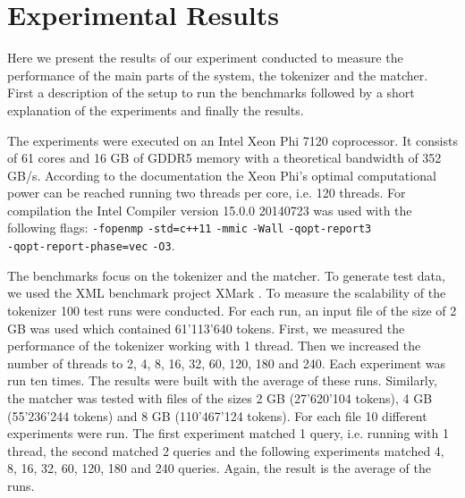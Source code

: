 
\section{Experimental Results}\label{sec:exp}

Here we present the results of our experiment conducted to measure the performance of the main parts of the system, the tokenizer and the matcher. First a description of the setup to run the benchmarks followed by a short explanation of the experiments and finally the results.

 The experiments were executed on an Intel Xeon Phi 7120 coprocessor. It consists of 61 cores and 16 GB of GDDR5 memory with a theoretical bandwidth of 352 GB/s. According to the documentation the Xeon Phi's optimal computational power can be reached running two threads per core, i.e. 120 threads.
For compilation the Intel Compiler version 15.0.0 20140723 was used with the following flags: \verb;-fopenmp; \verb;-std=c++11; \verb;-mmic; \verb;-Wall; \verb;-qopt-report3; \\ \verb;-qopt-report-phase=vec; \verb;-O3;.

The benchmarks focus on the tokenizer and the matcher. To generate test data, we used the XML benchmark project XMark \cite{Schmidt2002}. To measure the scalability of the tokenizer 100 test runs were conducted. For each run, an input file of the size of 2 GB was used which contained 61'113'640 tokens. First, we measured the performance of the tokenizer working with 1 thread. Then we increased the number of threads to 2, 4, 8, 16, 32, 60, 120, 180 and 240. Each experiment was run ten times. The results were built with the average of these runs. Similarly, the matcher was tested with files of the sizes 2 GB (27'620'104 tokens), 4 GB (55'236'244 tokens) and 8 GB (110'467'124 tokens). For each file 10 different experiments were run. The first experiment matched 1 query, i.e. running with 1 thread, the second matched 2 queries and the following experiments matched 4, 8, 16, 32, 60, 120, 180 and 240 queries. Again, the result is the average of the runs.

